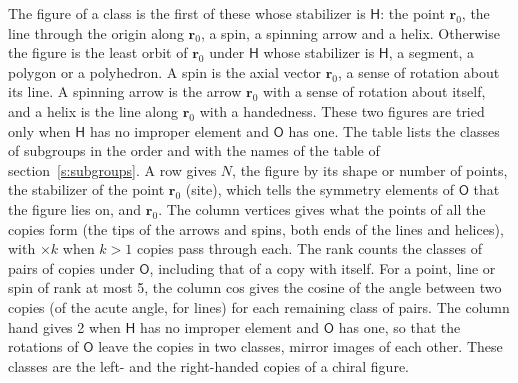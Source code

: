 \documentclass[10pt,a4paper]{article}
\numberwithin{equation}{section}
\newcommand{\grp}[1]{\mathsf{#1}}
\newcommand{\pointr}{\mathbf{r}}
\begin{document}
\leavevmode\label{n:head.figure}The figure of a class is the first of these whose stabilizer is $\grp{H}$: the point $\pointr_0$, the line through the origin along $\pointr_0$, a spin, a spinning arrow and a helix. Otherwise the figure is the least orbit of $\pointr_0$ under $\grp{H}$ whose stabilizer is $\grp{H}$, a segment, a polygon or a polyhedron. A spin is the axial vector $\pointr_0$, a sense of rotation about its line. A spinning arrow is the arrow $\pointr_0$ with a sense of rotation about itself, and a helix is the line along $\pointr_0$ with a handedness. These two figures are tried only when $\grp{H}$ has no improper element and $\grp{O}$ has one. The table lists the classes of subgroups in the order and with the names of the table of section~\ref{s:subgroups}. \label{n:head.site}A row gives $N$, the figure by its shape or number of points, the stabilizer of the point $\pointr_0$ (site), which tells the symmetry elements of $\grp{O}$ that the figure lies on, and $\pointr_0$. \label{n:head.vertices}The column vertices gives what the points of all the copies form (the tips of the arrows and spins, both ends of the lines and helices), with ${\times}k$ when $k > 1$ copies pass through each. \label{n:head.rank}The rank counts the classes of pairs of copies under $\grp{O}$, including that of a copy with itself. \label{n:head.cos}For a point, line or spin of rank at most 5, the column cos gives the cosine of the angle between two copies (of the acute angle, for lines) for each remaining class of pairs. \label{n:head.hand}The column hand gives 2 when $\grp{H}$ has no improper element and $\grp{O}$ has one, so that the rotations of $\grp{O}$ leave the copies in two classes, mirror images of each other. These classes are the left- and the right-handed copies of a chiral figure.
\end{document}
